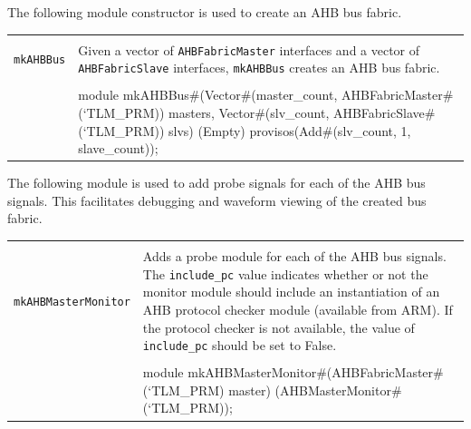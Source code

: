 \documentclass[twoside,letterpaper]{article}
\newcommand{\te}[1]{\texttt{#1}}
\newenvironment{libverbatim}
  {\vspace*{-1.0em}
   \verbatim}
  {\endverbatim
  }
\begin{document}


The following module constructor is used to create an AHB bus fabric.

\begin{center}
\begin{tabular}{|p{1.2 in}|p{5 in}|}
\hline 
&\\
\te{mkAHBBus}&Given a vector of \te{AHBFabricMaster} interfaces and a vector 
of \te{AHBFabricSlave} interfaces, \te{mkAHBBus} creates an AHB bus fabric. \\
&\\
\cline{2-2}
&\begin{libverbatim}
module mkAHBBus#(Vector#(master_count, 
                 AHBFabricMaster#(`TLM_PRM)) masters,
		 Vector#(slv_count, AHBFabricSlave#(`TLM_PRM)) slvs) (Empty)
         provisos(Add#(slv_count, 1, slave_count));
\end{libverbatim}
\\
\hline
\end{tabular}
\end{center}




The following module is used to add probe signals for each of the AHB
bus signals. This facilitates debugging and waveform viewing of the
created bus fabric.

\begin{center}
\begin{tabular}{|p{1.2 in}|p{5 in}|}
\hline 
&\\
\te{mkAHBMasterMonitor}&Adds a probe module for each of the AHB bus signals.
The \te{include\_pc} value indicates whether or not the monitor module
should include an instantiation of an AHB protocol checker module
(available from ARM).  If the protocol checker is not available, the
value of \te{include\_pc} should be set to False.  \\
&\\
\cline{2-2}
&\begin{libverbatim}
module mkAHBMasterMonitor#(AHBFabricMaster#(`TLM_PRM) master) 
                          (AHBMasterMonitor#(`TLM_PRM));
\end{libverbatim}
\\
\hline
\end{tabular}
\end{center}
\end{document}
